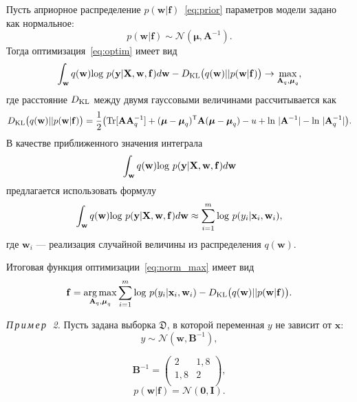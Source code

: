 Пусть априорное распределение $p(\mathbf{w}|\mathbf{f})$~\eqref{eq:prior} параметров модели задано как нормальное:
\[
	p(\mathbf{w}|\mathbf{f}) \sim \mathcal{N}(\boldsymbol{\mu}, \mathbf{A}^{-1}).
\] 
Тогда оптимизация~\eqref{eq:optim} имеет вид
\begin{equation}
\label{eq:norm_max}
 \int_{\mathbf{w}} q(\mathbf{w})\textnormal{log}~{p(\mathbf{y}|\mathbf{X},\mathbf{w},\mathbf{f})} d \mathbf{w} - D_\textnormal{KL}\bigl(q (\mathbf{w} )|| p (\mathbf{w}|\mathbf{f})\bigr) \to \max_{\mathbf{A}_q, \boldsymbol{\mu}_q},
\end{equation}
где расстояние $D_\textnormal{KL}$ между двумя гауссовыми величинами рассчитывается как 
\[
	D_\textnormal{KL}\bigl(q (\mathbf{w}) || p (\mathbf{w}|\mathbf{f})\bigr) = \frac{1}{2} \bigl( \textnormal{Tr} [\mathbf{A}\mathbf{A}^{-1}_q] + (\boldsymbol{\mu} - \boldsymbol{\mu}_q)^\mathsf{T}\mathbf{A}(\boldsymbol{\mu} - \boldsymbol{\mu}_q) - u +\textnormal{ln}~|\mathbf{A}^{-1}| - \textnormal{ln}~|\mathbf{A}_q^{-1}| \bigr).
\]
В качестве приближенного значения интеграла $$\int_{\mathbf{w}} q(\mathbf{w})\textnormal{log}~{p(\mathbf{y}|\mathbf{X},\mathbf{w},\mathbf{f})} d \mathbf{w}$$ предлагается использовать формулу
\[
\int_{\mathbf{w}} q(\mathbf{w})\textnormal{log}~{p(\mathbf{y}|\mathbf{X},\mathbf{w},\mathbf{f})} d \mathbf{w} \approx \sum_{i=1}^m \textnormal{log}~p({y}_i|\mathbf{x}_i, \mathbf{w}_i),
\]
где $\mathbf{w}_i$  --- реализация случайной величины из распределения $q(\mathbf{w})$.

Итоговая функция оптимизации~\eqref{eq:norm_max} имеет вид
\begin{equation}
\label{eq:gaus}
	\mathbf{f} = \operatorname*{arg\,max}_{\mathbf{A}_q, \boldsymbol{\mu}_q} \sum_{i=1}^m \textnormal{log}~p({y}_i|\mathbf{x}_i, \mathbf{w}_i) - D_\textnormal{KL}\bigl(q (\mathbf{w} )|| p (\mathbf{w}|\mathbf{f})\bigr).
\end{equation}

\textsl{П\,р\,и\,м\,е\,р~\,2.}
Пусть  задана выборка $\mathfrak{D}$, в которой переменная ${y}$ не зависит от $\mathbf{x}$:
\begin{equation}
\label{eq:example_post}
	{y} \sim \mathcal{N}(\mathbf{w}, \mathbf{B}^{-1}),
\end{equation}

\[
	\mathbf{B}^{-1} = \left( \begin{array}{cc}
	2 & 1,8 \\
	1,8 & 2\\
	\end{array}  \right),
\]
\[
	p(\mathbf{w}|\mathbf{f}) = \mathcal{N}(\mathbf{0}, \mathbf{I}).
\]

